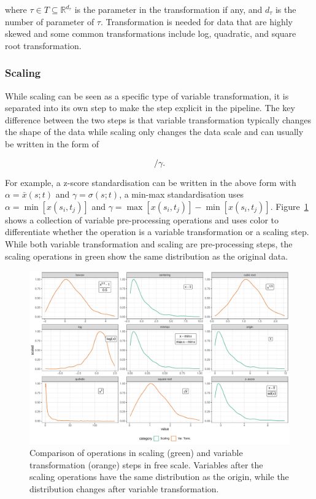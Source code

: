 \documentclass[
]{article}
\begin{document}
where \(\tau \in T \subseteq \mathbb{R}^{d_{\tau}}\) is the parameter in
the transformation if any, and \(d_{\tau}\) is the number of parameter
of \(\tau\). Transformation is needed for data that are highly skewed
and some common transformations include log, quadratic, and square root
transformation.

\hypertarget{scaling}{%
\subsubsection{Scaling}\label{scaling}}

While scaling can be seen as a specific type of variable transformation,
it is separated into its own step to make the step explicit in the
pipeline. The key difference between the two steps is that variable
transformation typically changes the shape of the data while scaling
only changes the data scale and can usually be written in the form of

\begin{equation}
[x(s_i;t_j) - \alpha]/\gamma.
\end{equation}

For example, a z-score standardisation can be written in the above form
with \(\alpha = \bar{x}(s; t)\) and \(\gamma = \sigma(s; t)\), a min-max
standardisation uses \(\alpha = \min[x(s_i, t_j)]\) and
\(\gamma = \max[x(s_i, t_j)] - \min[x(s_i, t_j)]\).
Figure~\ref{fig-scale-var-trans-compare} shows a collection of variable
pre-processing operations and uses color to differentiate whether the
operation is a variable transformation or a scaling step. While both
variable transformation and scaling are pre-processing steps, the
scaling operations in green show the same distribution as the original
data.

\begin{figure}

{\centering \includegraphics{paper_files/figure-pdf/fig-scale-var-trans-compare-1.pdf}

}

\caption{\label{fig-scale-var-trans-compare}Comparison of operations in
scaling (green) and variable transformation (orange) steps in free
scale. Variables after the scaling operations have the same distribution
as the origin, while the distribution changes after variable
transformation.}

\end{figure}
\end{document}
